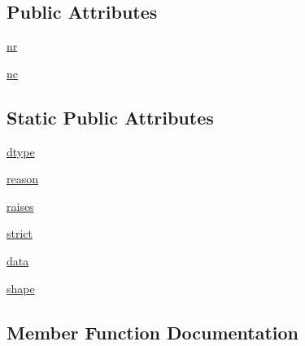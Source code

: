 \subsection*{Public Attributes}
\begin{DoxyCompactItemize}
\item 
\hyperlink{classnumpy_1_1core_1_1tests_1_1test__numeric_1_1TestClip_af38b63f8c21b7cc93961f1f113ba8d63}{nr}
\item 
\hyperlink{classnumpy_1_1core_1_1tests_1_1test__numeric_1_1TestClip_a6c3241e0f26a8ce0e2fa7ec50ee94681}{nc}
\end{DoxyCompactItemize}
\subsection*{Static Public Attributes}
\begin{DoxyCompactItemize}
\item 
\hyperlink{classnumpy_1_1core_1_1tests_1_1test__numeric_1_1TestClip_ad8043e11a09cde6a4dc15e86d71bbc1c}{dtype}
\item 
\hyperlink{classnumpy_1_1core_1_1tests_1_1test__numeric_1_1TestClip_a4ddf3474ae29f894eb7d4dcbfa07e195}{reason}
\item 
\hyperlink{classnumpy_1_1core_1_1tests_1_1test__numeric_1_1TestClip_a3858644ac68fb128e86b38f3ea7da780}{raises}
\item 
\hyperlink{classnumpy_1_1core_1_1tests_1_1test__numeric_1_1TestClip_a9b3f0d9b8b12e7e13cc6e685330c75c8}{strict}
\item 
\hyperlink{classnumpy_1_1core_1_1tests_1_1test__numeric_1_1TestClip_a739b854976645f08a33ea262d4e1fc87}{data}
\item 
\hyperlink{classnumpy_1_1core_1_1tests_1_1test__numeric_1_1TestClip_af7f3665c5fb9239d2df8144f450bc8bf}{shape}
\end{DoxyCompactItemize}


\subsection{Member Function Documentation}
\mbox{\label{classnumpy_1_1core_1_1tests_1_1test__numeric_1_1TestClip_ad87915349f7a968fe652688c2b968428}} 
